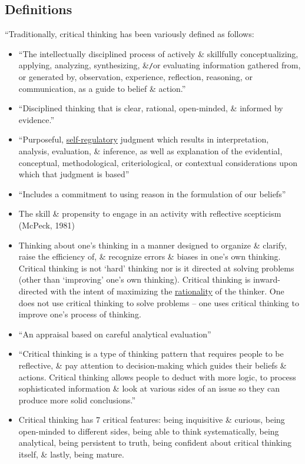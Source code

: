 \documentclass[oneside]{book}
\numberwithin{equation}{section}
\begin{document}
\subsection{Definitions}
``Traditionally, critical thinking has been variously defined as follows:
\begin{itemize}
	\item ``The intellectually disciplined process of actively \& skillfully conceptualizing, applying, analyzing, synthesizing, \&\texttt{/}or evaluating information gathered from, or generated by, observation, experience, reflection, reasoning, or communication, as a guide to belief \& action.''
	\item ``Disciplined thinking that is clear, rational, open-minded, \& informed by evidence.''
	\item ``Purposeful, \href{https://en.wikipedia.org/wiki/Self-control}{self-regulatory} judgment which results in interpretation, analysis, evaluation, \& inference, as well as explanation of the evidential, conceptual, methodological, criteriological, or contextual considerations upon which that judgment is based''
	\item ``Includes a commitment to using reason in the formulation of our beliefs''
	\item The skill \& propensity to engage in an activity with reflective scepticism (McPeck, 1981)
	\item Thinking about one's thinking in a manner designed to organize \& clarify, raise the efficiency of, \& recognize errors \& biases in one's own thinking. Critical thinking is not `hard' thinking nor is it directed at solving problems (other than `improving' one's own thinking). Critical thinking is inward-directed with the intent of maximizing the \href{https://en.wikipedia.org/wiki/Rationality}{rationality} of the thinker. One does not use critical thinking to solve problems -- one uses critical thinking to improve one's process of thinking.
	\item ``An appraisal based on careful analytical evaluation''
	\item ``Critical thinking is a type of thinking pattern that requires people to be reflective, \& pay attention to decision-making which guides their beliefs \& actions. Critical thinking allows people to deduct with more logic, to process sophisticated information \& look at various sides of an issue so they can produce more solid conclusions.''
	\item Critical thinking has 7 critical features: being inquisitive \& curious, being open-minded to different sides, being able to think systematically, being analytical, being persistent to truth, being confident about critical thinking itself, \& lastly, being mature.

\end{itemize}
\end{document}
